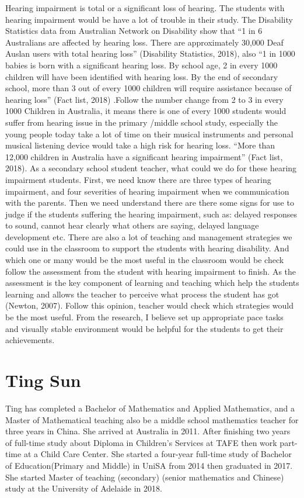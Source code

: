 \documentclass[twoside,14pt,a4paper,notitlepage]{memoir}
\begin{document}
Hearing impairment is total or a significant loss of hearing. The students with hearing impairment would be have a lot of trouble in their study.
The Disability Statistics data from Australian Network on Disability show that “1 in 6 Australians are affected by hearing loss. There are approximately 30,000 Deaf Auslan users with total hearing loss” (Disability Statistics, 2018), also “1 in 1000 babies is born with a significant hearing loss. By school age, 2 in every 1000 children will have been identified with hearing loss. By the end of secondary school, more than 3 out of every 1000 children will require assistance because of hearing loss” (Fact list, 2018) .Follow the number change from 2 to 3 in every 1000 Children in Australia, it means there is one of every 1000 students would suffer from hearing issue in the primary /middle school study, especially the young people today take a lot of time on their musical instruments and personal musical listening device would take a high risk for hearing loss. “More than 12,000 children in Australia have a significant hearing impairment” (Fact list, 2018).
As a secondary school student teacher, what could we do for these hearing impairment students. First, we need know there are three types of hearing impairment, and four severities of hearing impairment when we communication with the parents. Then we need understand there are there some signs for use to judge if the students suffering the hearing impairment, such as: delayed responses to sound, cannot hear clearly what others are saying, delayed language development etc. There are also a lot of teaching and management strategies we could use in the classroom to support the students with hearing disability. And which one or many would be the most useful in the classroom would be check follow the assessment from the student with hearing impairment to finish. As the assessment is the key component of learning and teaching which help the students learning and allows the teacher to perceive what process the student has got (Newton, 2007). Follow this opinion, teacher would check which strategies would be the most useful. From the research, I believe set up appropriate pace tasks and visually stable environment would be helpful for the students to get their achievements.

\section*{Ting Sun}

Ting has completed a Bachelor of Mathematics and Applied Mathematics, and a Master of Mathematical teaching also be a middle school mathematics teacher for three years in China. She arrived at Australia in 2011. After finishing two years of full-time study about Diploma in Children’s Services at TAFE then work part-time at a Child Care Center. She started a four-year full-time study of Bachelor of Education(Primary and Middle) in UniSA from 2014 then graduated in 2017. She started Master of teaching (secondary) (senior mathematics and Chinese) study at the University of Adelaide in 2018.
\end{document}
